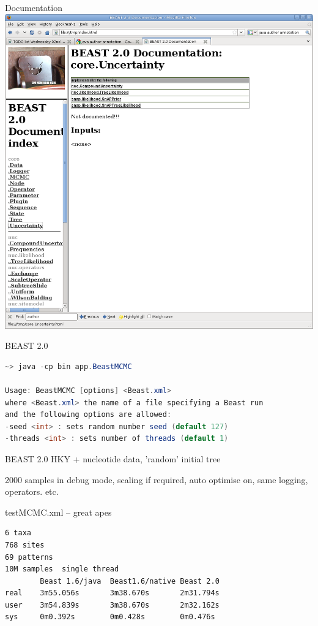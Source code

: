 \documentclass{beamer}
\theoremstyle{definition}
\begin{document}
\begin{frame}{Documentation}
\includegraphics[width=\textwidth]{beastdoc4.png}
\end{frame}


\begin{frame}[containsverbatim]
{\Large BEAST 2.0}

\begin{lstlisting}[language=java]
~> java -cp bin app.BeastMCMC

Usage: BeastMCMC [options] <Beast.xml>
where <Beast.xml> the name of a file specifying a Beast run
and the following options are allowed:
-seed <int> : sets random number seed (default 127)
-threads <int> : sets number of threads (default 1)
\end{lstlisting}

\end{frame}

\begin{frame}[containsverbatim]
{\Large BEAST 2.0}
HKY + nucleotide data, 'random' initial tree

2000 samples in debug mode, scaling if required, auto optimise on, same logging, operators. etc.

testMCMC.xml -- great apes

\begin{verbatim}
6 taxa 
768 sites
69 patterns
10M samples  single thread
        Beast 1.6/java  Beast1.6/native Beast 2.0
real    3m55.056s       3m38.670s       2m31.794s
user    3m54.839s       3m38.670s       2m32.162s
sys     0m0.392s        0m0.428s        0m0.476s
\end{verbatim}
\end{frame}
\end{document}
